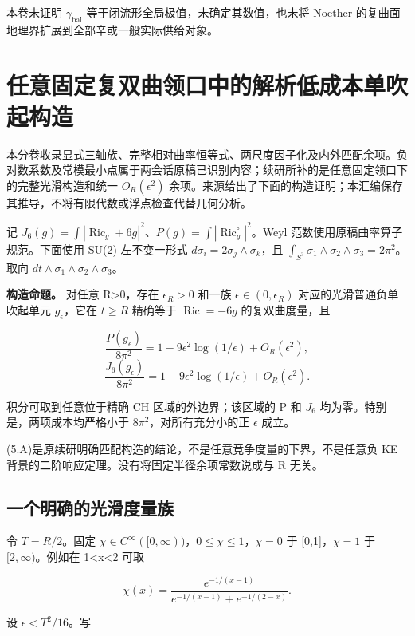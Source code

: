 \documentclass[UTF8,11pt,openany,fontset=none]{ctexbook}
\theoremstyle{definition}
\theoremstyle{remark}
\begin{document}
本卷未证明 \(\gamma_{\mathrm{bal}}\) 等于闭流形全局极值，未确定其数值，也未将 Noether 的复曲面地理界扩展到全部辛或一般实际供给对象。 \cite{I07,I08,LeBrunRicci,BF,Noether}


\chapter{任意固定复双曲领口中的解析低成本单吹起构造}
本分卷收录显式三轴族、完整相对曲率恒等式、两尺度因子化及内外匹配余项。负对数系数及常模最小点属于两会话原稿已识别内容；续研所补的是任意固定领口下的完整光滑构造和统一 \(O_R(\epsilon^2)\) 余项。来源给出了下面的构造证明；本汇编保存其推导，不将有限代数或浮点检查代替几何分析。\cite{R04,B04}

记 \(J_6(g)=\int |\operatorname{Ric}_g+6g|^2\)、\(P(g)=\int |\operatorname{Ric}_g^{\circ}|^2\)。Weyl 范数使用原稿曲率算子规范。下面使用 SU(2) 左不变一形式 \(d\sigma _i=2\sigma _j\wedge \sigma _k\)，且 \(\int _{S^3}\sigma _1\wedge \sigma _2\wedge \sigma _3=2\pi ^2\)。取向 \(dt\wedge \sigma _1\wedge \sigma _2\wedge \sigma _3\)。

\textbf{构造命题。} 对任意 R\textgreater0，存在 \(\epsilon _R>0\) 和一族 \(\epsilon \in (0,\epsilon _R)\) 对应的光滑普通负单吹起单元 \(g_\epsilon\)，它在 \(t\ge R\) 精确等于 \(\operatorname{Ric}=-6g\) 的复双曲度量，且

\[
\frac{P(g_\epsilon)}{8\pi^2}
=1-9\epsilon^2\log(1/\epsilon)+O_R(\epsilon^2),
\] \[
\frac{J_6(g_\epsilon)}{8\pi^2}
=1-9\epsilon^2\log(1/\epsilon)+O_R(\epsilon^2).
\tag{5.A}
\]

积分可取到任意位于精确 CH 区域的外边界；该区域的 P 和 \(J_6\) 均为零。特别是，两项成本均严格小于 \(8\pi ^2\)，对所有充分小的正 \(\epsilon\) 成立。

(5.A)是原续研明确匹配构造的结论，不是任意竞争度量的下界，不是任意负 KE 背景的二阶响应定理。没有将固定半径余项常数说成与 R 无关。

\section{一个明确的光滑度量族}\label{v5-ux4e00ux4e2aux660eux786eux7684ux5149ux6ed1ux5ea6ux91cfux65cf}

令 \(T=R/2\)。固定 \(\chi \in C^\infty ([0,\infty ))\)，\(0\le \chi \le 1\)，\(\chi =0\) 于 {[}0,1{]}，\(\chi =1\) 于 \([2,\infty )\)。例如在 1\textless x\textless2 可取

\[
\chi(x)=\frac{e^{-1/(x-1)}}{e^{-1/(x-1)}+e^{-1/(2-x)}}.
\]

设 \(\epsilon <T^2/16\)。写
\end{document}
